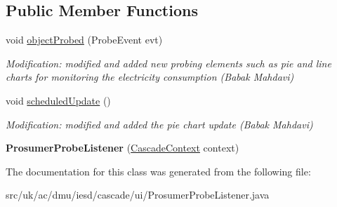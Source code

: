 \subsection*{Public Member Functions}
\begin{DoxyCompactItemize}
\item 
\hypertarget{classuk_1_1ac_1_1dmu_1_1iesd_1_1cascade_1_1ui_1_1_prosumer_probe_listener_a8ddbd26cd7b9b8b70b6b82c0708e504b}{void \hyperlink{classuk_1_1ac_1_1dmu_1_1iesd_1_1cascade_1_1ui_1_1_prosumer_probe_listener_a8ddbd26cd7b9b8b70b6b82c0708e504b}{object\-Probed} (Probe\-Event evt)}\label{classuk_1_1ac_1_1dmu_1_1iesd_1_1cascade_1_1ui_1_1_prosumer_probe_listener_a8ddbd26cd7b9b8b70b6b82c0708e504b}

\begin{DoxyCompactList}\small\item\em Modification\-: modified and added new probing elements such as pie and line charts for monitoring the electricity consumption (Babak Mahdavi) \end{DoxyCompactList}\item 
\hypertarget{classuk_1_1ac_1_1dmu_1_1iesd_1_1cascade_1_1ui_1_1_prosumer_probe_listener_a8c27c6874ca1c6ce200ed727416e8425}{void \hyperlink{classuk_1_1ac_1_1dmu_1_1iesd_1_1cascade_1_1ui_1_1_prosumer_probe_listener_a8c27c6874ca1c6ce200ed727416e8425}{scheduled\-Update} ()}\label{classuk_1_1ac_1_1dmu_1_1iesd_1_1cascade_1_1ui_1_1_prosumer_probe_listener_a8c27c6874ca1c6ce200ed727416e8425}

\begin{DoxyCompactList}\small\item\em Modification\-: modified and added the pie chart update (Babak Mahdavi) \end{DoxyCompactList}\item 
\hypertarget{classuk_1_1ac_1_1dmu_1_1iesd_1_1cascade_1_1ui_1_1_prosumer_probe_listener_aa809e398c4485f1ac326716003680912}{{\bfseries Prosumer\-Probe\-Listener} (\hyperlink{classuk_1_1ac_1_1dmu_1_1iesd_1_1cascade_1_1context_1_1_cascade_context}{Cascade\-Context} context)}\label{classuk_1_1ac_1_1dmu_1_1iesd_1_1cascade_1_1ui_1_1_prosumer_probe_listener_aa809e398c4485f1ac326716003680912}

\end{DoxyCompactItemize}


The documentation for this class was generated from the following file\-:\begin{DoxyCompactItemize}
\item 
src/uk/ac/dmu/iesd/cascade/ui/Prosumer\-Probe\-Listener.\-java\end{DoxyCompactItemize}
